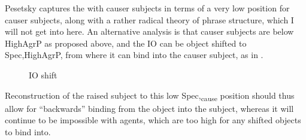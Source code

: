 \documentclass[output=paper,colorlinks,citecolor=brown]{langscibook}
\begin{document}





\noindent Pesetsky captures the  with causer subjects in terms of a very low position for causer subjects, along with a rather radical theory of phrase structure, which I will not get into here. An alternative analysis is that causer subjects are below HighAgrP as proposed above, and the IO can be object shifted to Spec,HighAgrP, from where it can bind into the causer subject, as in . 

\begin{figure}
\caption{IO shift}
\label{gt:6yf}
\end{figure}

Reconstruction of the raised subject to this low Spec,\textsubscript{cause} position should thus allow for ``backwards'' binding from the object into the subject, whereas it will continue to be impossible with agents, which are too high for any shifted objects to bind into. 
\end{document}
